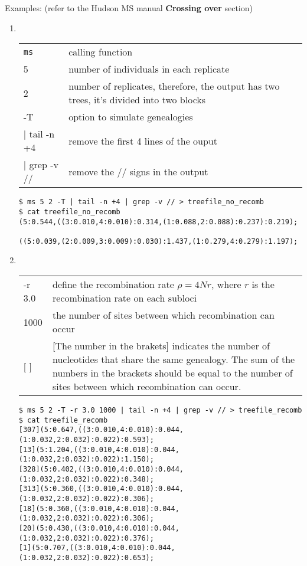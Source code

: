 Examples: (refer to the Hudson MS manual {\bf Crossing over} section)
\begin{enumerate}
\item ~\\
\begin{tabular}{lp{11cm}}
{\tt ms} & calling function\\
5& number of individuals in each replicate\\
2& number of replicates, therefore, the output has two trees, it's divided into two blocks\\
-T& option to simulate genealogies\\
| tail -n +4 & remove the first 4 lines of the ouput\\
| grep -v // & remove the // signs in the output
\end{tabular}
\begin{verbatim}
$ ms 5 2 -T | tail -n +4 | grep -v // > treefile_no_recomb
$ cat treefile_no_recomb 
(5:0.544,((3:0.010,4:0.010):0.314,(1:0.088,2:0.088):0.237):0.219);

((5:0.039,(2:0.009,3:0.009):0.030):1.437,(1:0.279,4:0.279):1.197);
\end{verbatim}



\item ~\\
\begin{tabular}{lp{11cm}}
-r 3.0 & define the recombination rate $\rho=4Nr$, where $r$ is the recombination rate on each subloci\\
1000 & the number of sites between which recombination can occur\\
{\color{red} [ ]} & {\color{red} [The number in the brakets] indicates the number of nucleotides that share the same genealogy. The sum of the numbers in the brackets should be equal to the number of sites between which recombination can occur.} \\
\end{tabular}
\begin{verbatim}
$ ms 5 2 -T -r 3.0 1000 | tail -n +4 | grep -v // > treefile_recomb
$ cat treefile_recomb 
[307](5:0.647,((3:0.010,4:0.010):0.044,(1:0.032,2:0.032):0.022):0.593);
[13](5:1.204,((3:0.010,4:0.010):0.044,(1:0.032,2:0.032):0.022):1.150);
[328](5:0.402,((3:0.010,4:0.010):0.044,(1:0.032,2:0.032):0.022):0.348);
[313](5:0.360,((3:0.010,4:0.010):0.044,(1:0.032,2:0.032):0.022):0.306);
[18](5:0.360,((3:0.010,4:0.010):0.044,(1:0.032,2:0.032):0.022):0.306);
[20](5:0.430,((3:0.010,4:0.010):0.044,(1:0.032,2:0.032):0.022):0.376);
[1](5:0.707,((3:0.010,4:0.010):0.044,(1:0.032,2:0.032):0.022):0.653);


\end{verbatim}
\end{enumerate}
